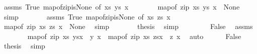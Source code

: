 \begin{isabellebody}
\ assms\ True\ map{\isacharunderscore}{\kern0pt}of{\isacharunderscore}{\kern0pt}zip{\isacharunderscore}{\kern0pt}is{\isacharunderscore}{\kern0pt}None\ {\isacharbrackleft}{\kern0pt}of\ xs\ ys\ x{\isacharprime}{\kern0pt}{\isacharbrackright}{\kern0pt}\isanewline
\ \ \ \ \ \ \isamarkupfalse%
\ {\isachardoublequoteopen}map{\isacharunderscore}{\kern0pt}of\ {\isacharparenleft}{\kern0pt}zip\ xs\ ys{\isacharparenright}{\kern0pt}\ x{\isacharprime}{\kern0pt}\ {\isacharequal}{\kern0pt}\ None{\isachardoublequoteclose}\ \isamarkupfalse%
\ simp\isanewline
\ \ \ \ \isamarkupfalse%
\ \isamarkupfalse%
\ assms\ True\ map{\isacharunderscore}{\kern0pt}of{\isacharunderscore}{\kern0pt}zip{\isacharunderscore}{\kern0pt}is{\isacharunderscore}{\kern0pt}None\ {\isacharbrackleft}{\kern0pt}of\ xs\ zs\ x{\isacharprime}{\kern0pt}{\isacharbrackright}{\kern0pt}\isanewline
\ \ \ \ \ \ \isamarkupfalse%
\ {\isachardoublequoteopen}map{\isacharunderscore}{\kern0pt}of\ {\isacharparenleft}{\kern0pt}zip\ xs\ zs{\isacharparenright}{\kern0pt}\ x{\isacharprime}{\kern0pt}\ {\isacharequal}{\kern0pt}\ None{\isachardoublequoteclose}\ \isamarkupfalse%
\ simp\isanewline
\ \ \ \ \isamarkupfalse%
\ \isamarkupfalse%
\ {\isacharquery}{\kern0pt}thesis\ \isamarkupfalse%
\ simp\isanewline
\ \ \isamarkupfalse%
\isanewline
\ \ \ \ \isamarkupfalse%
\ False\ \isamarkupfalse%
\ assms\isanewline
\ \ \ \ \ \ \isamarkupfalse%
\ {\isachardoublequoteopen}{\isacharparenleft}{\kern0pt}map{\isacharunderscore}{\kern0pt}of\ {\isacharparenleft}{\kern0pt}zip\ xs\ ys{\isacharparenright}{\kern0pt}{\isacharparenleft}{\kern0pt}x\ {\isasymmapsto}\ y{\isacharparenright}{\kern0pt}{\isacharparenright}{\kern0pt}\ x{\isacharprime}{\kern0pt}\ {\isacharequal}{\kern0pt}\ {\isacharparenleft}{\kern0pt}map{\isacharunderscore}{\kern0pt}of\ {\isacharparenleft}{\kern0pt}zip\ xs\ zs{\isacharparenright}{\kern0pt}{\isacharparenleft}{\kern0pt}x\ {\isasymmapsto}\ z{\isacharparenright}{\kern0pt}{\isacharparenright}{\kern0pt}\ x{\isacharprime}{\kern0pt}{\isachardoublequoteclose}\ \isamarkupfalse%
\ auto\isanewline
\ \ \ \ \isamarkupfalse%
\ False\ \isamarkupfalse%
\ {\isacharquery}{\kern0pt}thesis\ \isamarkupfalse%
\ simp\isanewline
\ \ \isamarkupfalse%
\isanewline
{}\isamarkupfalse%
%
\endisatagproof
{\isafoldproof}%
%
\isadelimproof
\isanewline

\end{isabellebody}
